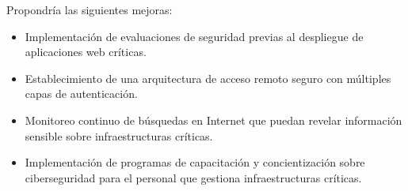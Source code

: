 Propondría las siguientes mejoras:

\begin{itemize}
    \item Implementación de evaluaciones de seguridad previas al despliegue de aplicaciones web críticas.
    \item Establecimiento de una arquitectura de acceso remoto seguro con múltiples capas de autenticación.
    \item Monitoreo continuo de búsquedas en Internet que puedan revelar información sensible sobre infraestructuras críticas.
    \item Implementación de programas de capacitación y concientización sobre ciberseguridad para el personal que gestiona infraestructuras críticas.
\end{itemize}

